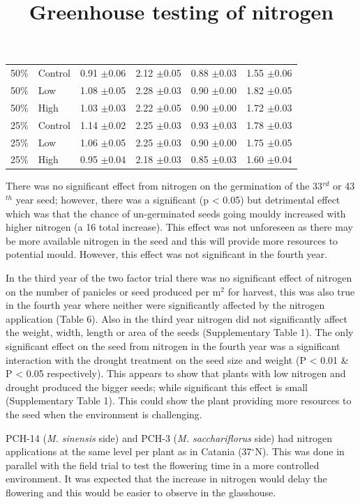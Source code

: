 \documentclass[fleqn, 15pt, lineno]{olplainarticle}
\begin{document}
\begin{table}[ht]
\begin{tabular}{l l  S S  S  S}
50\%		& Control 	&0.91 $\pm$0.06 &2.12 $\pm$0.05     &0.88 $\pm$0.03	&1.55 $\pm$0.06 \\
50\%		& Low 		&1.08 $\pm$0.05	&2.28 $\pm$0.03     &0.90 $\pm$0.00	&1.82 $\pm$0.05 \\
50\%		& High 		&1.03 $\pm$0.03 &2.22 $\pm$0.05     &0.90 $\pm$0.00	&1.72 $\pm$0.03 \\
25\%		& Control 	&1.14 $\pm$0.02 &2.25 $\pm$0.03     &0.93 $\pm$0.03	&1.78 $\pm$0.03 \\
25\%		& Low 		&1.06 $\pm$0.05 &2.25 $\pm$0.03     &0.90 $\pm$0.00	&1.75 $\pm$0.05 \\
25\%		& High 		&0.95 $\pm$0.04 &2.18 $\pm$0.03     &0.85 $\pm$0.03	&1.60 $\pm$0.04 \\
\bottomrule
\end{tabular}
\label{tab:twofactorseed}
\end{table}


There was no significant effect from nitrogen on the germination of the 33$^{rd}$ or 43$^{th}$ year seed; however, there was a significant (p < 0.05) but detrimental effect which was that the chance of un-germinated seeds going mouldy increased with higher nitrogen (a 16 total increase).
This effect was not unforeseen as there may be more available nitrogen in the seed and this will provide more resources to potential mould.
However, this effect was not significant in the fourth year.

In the third year of the two factor trial there was no significant effect of nitrogen on the number of panicles or seed produced per m$^2$ for harvest, this was also true in the fourth year where neither were significantly affected by the nitrogen application (Table 6).
Also in the third year nitrogen did not significantly affect the weight, width, length or area of the seeds (Supplementary Table 1).
The only significant effect on the seed from nitrogen in the fourth year was a significant interaction with the drought treatment on the seed size and weight (P < 0.01 \& P < 0.05 respectively).
This appears to show that plants with low nitrogen and drought produced the bigger seeds; while significant this effect is small (Supplementary Table 1).
This could show the plant providing more resources to the seed when the environment is challenging.




\FloatBarrier
\title{Greenhouse testing of nitrogen}

PCH-14 (\textit{M. sinensis} side) and PCH-3 (\textit{M. sacchariflorus} side) had nitrogen applications at the same level per plant as in Catania (37$^{\circ}$N).
This was done in parallel with the field trial to test the flowering time in a more controlled environment.
It was expected that the increase in nitrogen would delay the flowering and this would be easier to observe in the glasshouse.
\end{document}
